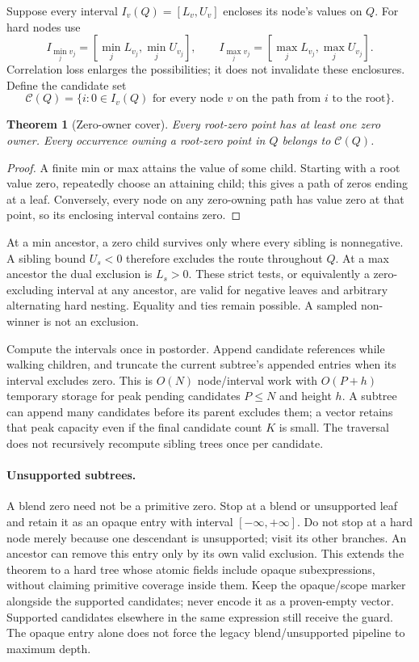 \documentclass[11pt]{article}
\newtheorem{theorem}{Theorem}
\begin{document}
Suppose every interval \(I_v(Q)=[L_v,U_v]\) encloses its node's values on \(Q\).
For hard nodes use
\[
 I_{\min_j v_j}=[\min_j L_{v_j},\min_j U_{v_j}],\qquad
 I_{\max_j v_j}=[\max_j L_{v_j},\max_j U_{v_j}].
\]
Correlation loss enlarges the possibilities; it does not invalidate these
enclosures. Define the candidate set
\[
 \mathcal C(Q)=\{i:0\in I_v(Q)\text{ for every node }v
                       \text{ on the path from }i\text{ to the root}\}.
\]

\begin{theorem}[Zero-owner cover]
Every root-zero point has at least one zero owner. Every occurrence owning
a root-zero point in \(Q\) belongs to \(\mathcal C(Q)\).
\end{theorem}
\begin{proof}
A finite min or max attains the value of some child. Starting with a root
value zero, repeatedly choose an attaining child; this gives a path of zeros
ending at a leaf. Conversely, every node on any zero-owning path has value
zero at that point, so its enclosing interval contains zero.
\end{proof}

At a min ancestor, a zero child survives only where every sibling is
nonnegative. A sibling bound \(U_s<0\) therefore excludes the route throughout
\(Q\). At a max ancestor the dual exclusion is \(L_s>0\). These strict tests,
or equivalently a zero-excluding interval at any ancestor, are valid for
negative leaves and arbitrary alternating hard nesting. Equality and ties
remain possible. A sampled non-winner is not an exclusion.

Compute the intervals once in postorder. Append candidate references while
walking children, and truncate the current subtree's appended entries when
its interval excludes zero. This is \(O(N)\) node/interval work with
\(O(P+h)\) temporary storage for peak pending candidates \(P\le N\) and
height \(h\). A subtree can append many candidates before its parent excludes
them; a vector retains that peak capacity even if the final candidate count
\(K\) is small. The traversal does not recursively recompute sibling trees
once per candidate.

\paragraph{Unsupported subtrees.}
A blend zero need not be a primitive zero. Stop at a blend or unsupported leaf
and retain it as an opaque entry with interval \([{-\infty},+\infty]\).
Do not stop at a hard node merely because one descendant is unsupported;
visit its other branches. An ancestor can remove this entry only by
its own valid exclusion. This extends the theorem to a hard tree whose atomic
fields include opaque subexpressions, without claiming primitive coverage
inside them. Keep the opaque/scope marker alongside the supported candidates;
never encode it as a proven-empty vector. Supported candidates elsewhere in
the same expression still receive the guard. The opaque entry alone does not
force the legacy blend/unsupported pipeline to maximum depth.
\end{document}

